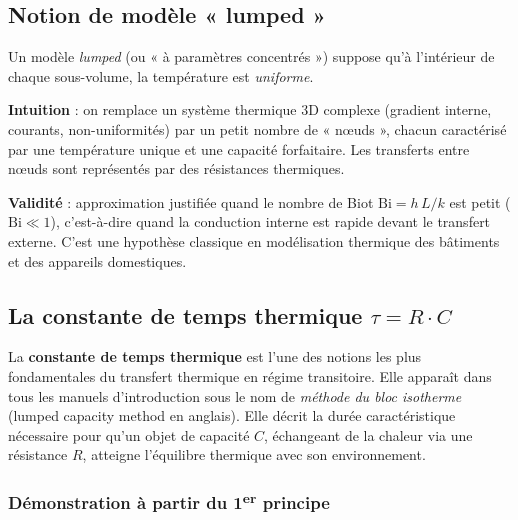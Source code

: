\documentclass[11pt,a4paper]{article}
\begin{document}
\subsection{Notion de modèle « lumped »}

\begin{principe}
Un modèle \emph{lumped} (ou « à paramètres concentrés ») suppose qu'à l'intérieur de chaque
sous-volume, la température est \emph{uniforme}.
\end{principe}

\textbf{Intuition} : on remplace un système thermique 3D complexe (gradient interne, courants,
non-uniformités) par un petit nombre de « nœuds », chacun caractérisé par une température
unique et une capacité forfaitaire. Les transferts entre nœuds sont représentés par des
résistances thermiques.

\textbf{Validité} : approximation justifiée quand le nombre de Biot $\mathrm{Bi} = h\,L/k$
est petit ($\mathrm{Bi} \ll 1$), c'est-à-dire quand la conduction interne est rapide devant
le transfert externe. C'est une hypothèse classique en modélisation thermique des bâtiments
et des appareils domestiques.

\subsection{La constante de temps thermique \texorpdfstring{$\tau = R \cdot C$}{tau = R · C}}

\begin{principe}
La \textbf{constante de temps thermique} est l'une des notions les plus fondamentales du
transfert thermique en régime transitoire. Elle apparaît dans tous les manuels d'introduction
sous le nom de \emph{méthode du bloc isotherme} (\og lumped capacity method \fg{} en
anglais). Elle décrit la durée caractéristique nécessaire pour qu'un objet de capacité $C$,
échangeant de la chaleur via une résistance $R$, atteigne l'équilibre thermique avec son
environnement.
\end{principe}

\subsubsection*{Démonstration à partir du 1\textsuperscript{er} principe}
\end{document}
